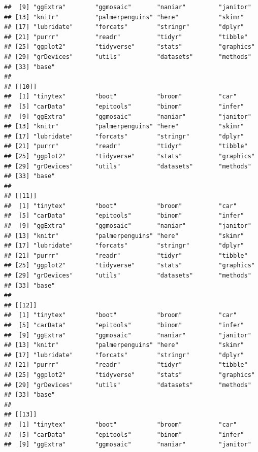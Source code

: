 \documentclass[
]{book}
\begin{document}
\begin{verbatim}
##  [9] "ggExtra"        "ggmosaic"       "naniar"         "janitor"       
## [13] "knitr"          "palmerpenguins" "here"           "skimr"         
## [17] "lubridate"      "forcats"        "stringr"        "dplyr"         
## [21] "purrr"          "readr"          "tidyr"          "tibble"        
## [25] "ggplot2"        "tidyverse"      "stats"          "graphics"      
## [29] "grDevices"      "utils"          "datasets"       "methods"       
## [33] "base"          
## 
## [[10]]
##  [1] "tinytex"        "boot"           "broom"          "car"           
##  [5] "carData"        "epitools"       "binom"          "infer"         
##  [9] "ggExtra"        "ggmosaic"       "naniar"         "janitor"       
## [13] "knitr"          "palmerpenguins" "here"           "skimr"         
## [17] "lubridate"      "forcats"        "stringr"        "dplyr"         
## [21] "purrr"          "readr"          "tidyr"          "tibble"        
## [25] "ggplot2"        "tidyverse"      "stats"          "graphics"      
## [29] "grDevices"      "utils"          "datasets"       "methods"       
## [33] "base"          
## 
## [[11]]
##  [1] "tinytex"        "boot"           "broom"          "car"           
##  [5] "carData"        "epitools"       "binom"          "infer"         
##  [9] "ggExtra"        "ggmosaic"       "naniar"         "janitor"       
## [13] "knitr"          "palmerpenguins" "here"           "skimr"         
## [17] "lubridate"      "forcats"        "stringr"        "dplyr"         
## [21] "purrr"          "readr"          "tidyr"          "tibble"        
## [25] "ggplot2"        "tidyverse"      "stats"          "graphics"      
## [29] "grDevices"      "utils"          "datasets"       "methods"       
## [33] "base"          
## 
## [[12]]
##  [1] "tinytex"        "boot"           "broom"          "car"           
##  [5] "carData"        "epitools"       "binom"          "infer"         
##  [9] "ggExtra"        "ggmosaic"       "naniar"         "janitor"       
## [13] "knitr"          "palmerpenguins" "here"           "skimr"         
## [17] "lubridate"      "forcats"        "stringr"        "dplyr"         
## [21] "purrr"          "readr"          "tidyr"          "tibble"        
## [25] "ggplot2"        "tidyverse"      "stats"          "graphics"      
## [29] "grDevices"      "utils"          "datasets"       "methods"       
## [33] "base"          
## 
## [[13]]
##  [1] "tinytex"        "boot"           "broom"          "car"           
##  [5] "carData"        "epitools"       "binom"          "infer"         
##  [9] "ggExtra"        "ggmosaic"       "naniar"         "janitor"       

\end{verbatim}
\end{document}
